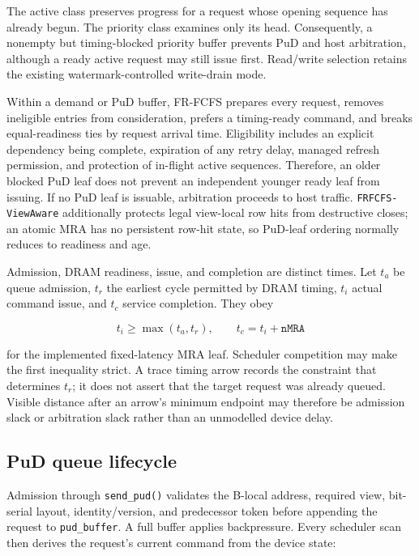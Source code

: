 \documentclass[9pt,twocolumn]{extarticle}
\newcommand{\cmd}[1]{\texttt{#1}}
\newcommand{\param}[1]{\texttt{#1}}
\begin{document}
The active class preserves progress for a request whose opening sequence has
already begun. The priority class examines only its head. Consequently, a
nonempty but timing-blocked priority buffer prevents PuD and host arbitration,
although a ready active request may still issue first. Read/write selection
retains the existing watermark-controlled write-drain mode.

Within a demand or PuD buffer, FR-FCFS prepares every request, removes
ineligible entries from consideration, prefers a timing-ready command, and
breaks equal-readiness ties by request arrival time. Eligibility includes an
explicit dependency being complete, expiration of any retry delay, managed
refresh permission, and protection of in-flight active sequences. Therefore,
an older blocked PuD leaf does not prevent an independent younger ready leaf
from issuing. If no PuD leaf is issuable, arbitration proceeds to host
traffic. \cmd{FRFCFS-ViewAware} additionally protects legal view-local row
hits from destructive closes; an atomic MRA has no persistent row-hit state,
so PuD-leaf ordering normally reduces to readiness and age.

Admission, DRAM readiness, issue, and completion are distinct times. Let
$t_a$ be queue admission, $t_r$ the earliest cycle permitted by DRAM timing,
$t_i$ actual command issue, and $t_c$ service completion. They obey

\begin{equation}
  t_i \ge \max(t_a,t_r), \qquad
  t_c = t_i + \param{nMRA}
\end{equation}

for the implemented fixed-latency MRA leaf. Scheduler competition may make the
first inequality strict. A trace timing arrow records the constraint that
determines $t_r$; it does not assert that the target request was already
queued. Visible distance after an arrow's minimum endpoint may therefore be
admission slack or arbitration slack rather than an unmodelled device delay.

\subsection{PuD queue lifecycle}

Admission through \cmd{send\_pud()} validates the B-local address, required
view, bit-serial layout, identity/version, and predecessor token before
appending the request to \cmd{pud\_buffer}. A full buffer applies backpressure.
Every scheduler scan then derives the request's current command from the
device state:
\end{document}
